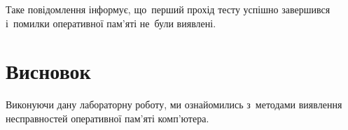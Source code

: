 \documentclass[
	a4paper,
	oneside,
	BCOR = 10mm,
	DIV = 12,
	12pt,
	headings = normal,
]{scrartcl}
\begin{document}
			Таке повідомлення інформує, що~перший прохід тесту успішно завершився і~помилки оперативної пам'яті не~були виявлені. 

	\section{Висновок}
		Виконуючи дану лабораторну роботу, ми ознайомились з~методами виявлення несправностей оперативної пам'\-я\-ті ком\-п'\-ю\-те\-ра.
\end{document}
